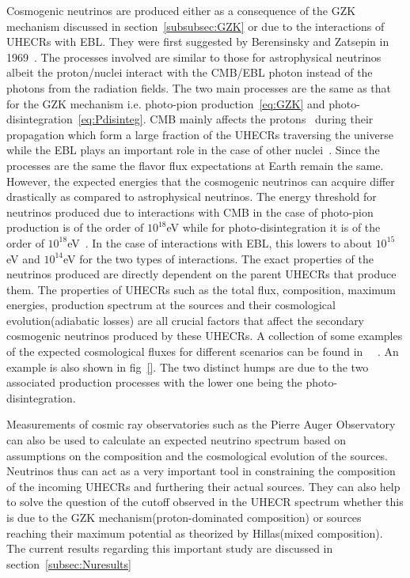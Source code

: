 Cosmogenic neutrinos are produced either as a consequence of the GZK mechanism discussed in section~\ref{subsubsec:GZK} or due to the interactions of UHECRs with EBL. They were first suggested by Berensinsky and Zatsepin in 1969~\cite{Berezinsky:1970xj}. The processes involved are similar to those for astrophysical neutrinos albeit the proton/nuclei interact with the CMB/EBL photon instead of the photons from the radiation fields. The two main processes are the same as that for the GZK mechanism i.e. photo-pion production~\ref{eq:GZK} and photo-disintegration~\ref{eq:Pdisinteg}. CMB mainly affects the protons~\cite{Ehlert_2024} during their propagation which form a large fraction of the UHECRs traversing the universe while the EBL plays an important role in the case of other nuclei~\cite{Aloisio_2015}. 
Since the processes are the same the flavor flux expectations at Earth remain the same. However, the expected energies that the cosmogenic neutrinos can acquire differ drastically as compared to astrophysical neutrinos. The energy threshold for neutrinos produced due to interactions with CMB in the case of photo-pion production is of the order of $10^{18}$eV while for photo-disintegration it is of the order of $10^{18}$eV~\cite{Aloisio_2015}. In the case of interactions with EBL, this lowers to about $10^{15}$eV and $10^{14}$eV for the two types of interactions. 
The exact properties of the neutrinos produced are directly dependent on the parent UHECRs that produce them. The properties of UHECRs such as the total flux, composition, maximum energies, production spectrum at the sources and their cosmological evolution(adiabatic losses) are all crucial factors that affect the  secondary cosmogenic neutrinos produced by these UHECRs. A collection of some examples of the expected cosmological fluxes for different scenarios can be found in ~\cite{KAMPERT2012660}~\cite{AlvesBatista:2018zui}. An example is also shown in fig~\ref{}. The two distinct humps are due to the two associated production processes with the lower one being the photo-disintegration. 

Measurements of cosmic ray observatories such as the Pierre Auger Observatory can also be used to calculate an expected neutrino spectrum based on assumptions on the composition and the cosmological evolution of the sources. Neutrinos thus can act as a very important tool in constraining the composition of the incoming UHECRs and furthering their actual sources. They can also help to solve the question of the cutoff observed in the UHECR spectrum whether this is due to the GZK mechanism(proton-dominated composition) or sources reaching their maximum potential as theorized by Hillas(mixed composition). The current results regarding this important study are discussed in section~\ref{subsec:Nuresults}


